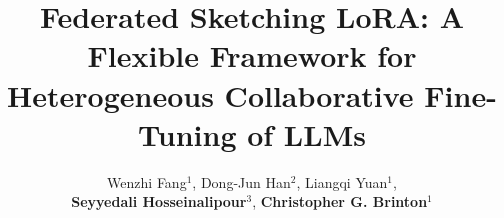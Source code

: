 \documentclass{article} %
\title{Federated Sketching LoRA: A Flexible Framework for Heterogeneous Collaborative Fine-Tuning of LLMs}
\author{
  Wenzhi Fang$^{1}$,
  Dong-Jun Han$^{2}$,
  Liangqi Yuan$^{1}$, \\
  \textbf{Seyyedali Hosseinalipour}$^{3}$, \textbf{Christopher G. Brinton}$^{1}$
}
\theoremstyle{plain}
\theoremstyle{definition}
\begin{document}

\maketitle

\end{document}
